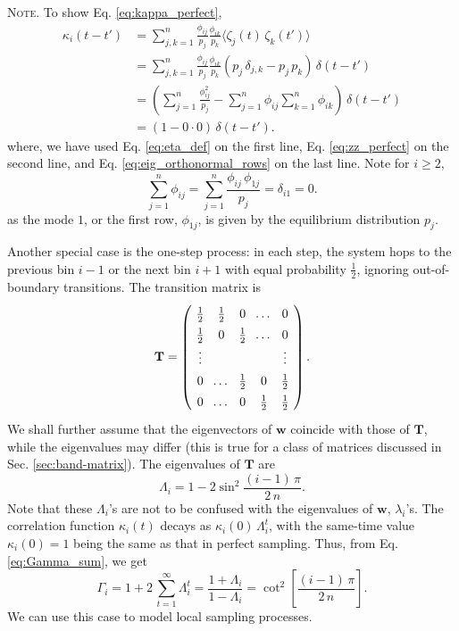 \documentclass[reprint]{revtex4-1}
\newcommand{\note}[1]{{\color{DarkGreen}\footnotesize \textsc{Note.} #1}}
\begin{document}
%
\note{To show Eq. \eqref{eq:kappa_perfect},
  $$
  \begin{aligned}
  \kappa_i(t - t')
  &=
  \sum_{j,k = 1}^n
  \frac{ \phi_{ij} } { p_j }
  \frac{ \phi_{ik} } { p_k }
  \langle \zeta_j(t) \, \zeta_k(t') \rangle
  \\
  &=
  \sum_{j,k = 1}^n
  \frac{ \phi_{ij} } { p_j }
  \frac{ \phi_{ik} } { p_k }
  \left(
    p_j \, \delta_{j, k} - p_j \, p_k
  \right)
  \, \delta(t - t')
  \\
  &=
  \left(
    \sum_{j = 1}^n
    \frac{ \phi_{ij}^2 } { p_j }
    -
    \sum_{j = 1}^n \phi_{ij}
    \sum_{k = 1}^n \phi_{ik}
  \right)
  \, \delta(t - t')
  \\
  &=
  (1 - 0 \cdot 0) \, \delta(t - t').
  \end{aligned}
  $$
  where,
  we have used
  Eq. \eqref{eq:eta_def}
  on the first line,
  Eq. \eqref{eq:zz_perfect}
  on the second line,
  and
  Eq. \eqref{eq:eig_orthonormal_rows}
  on the last line.
  Note for $i \ge 2$,
  $$
  \sum_{j = 1}^n \phi_{ij}
  =
  \sum_{j = 1}^n \frac{ \phi_{ij} \, \phi_{1j} } { p_j }
  =
  \delta_{i1}
  =
  0.
  $$
  as the mode $1$, or the first row, $\phi_{1j}$,
  is given by the equilibrium distribution $p_j$.
}


Another special case is the one-step process\cite{vankampen}:
in each step, the system hops to the previous bin $i - 1$
or the next bin $i + 1$ with equal probability $\frac 1 2$,
ignoring out-of-boundary transitions.
%
The transition matrix is
%
\begin{equation}
\arraycolsep=3.6pt\def\arraystretch{1.4}
\mathbf T
=
\left(
  \begin{array}{cccccccc}
    \frac 1 2 & \frac 1 2 & 0 & \dots & 0 \\
    \frac 1 2 & 0         & \frac 1 2 & \dots & 0 \\
    \vdots & &  & & \vdots \\
    0 & \dots & \frac 1 2 & 0  & \frac 1 2 \\
    0 & \dots & 0 & \frac 1 2 & \frac 1 2
  \end{array}
\right).
\label{eq:T_tridiag}
\end{equation}
%
We shall further assume that
the eigenvectors of $\mathbf w$
coincide with those of $\mathbf T$,
while the eigenvalues may differ
(this is true for a class of matrices
discussed in Sec. \ref{sec:band-matrix}).
%
The eigenvalues of $\mathbf T$ are
$$
\Lambda_i = 1 - 2 \sin^2 \frac{ (i - 1) \, \pi } { 2 \, n }.
$$
Note that these $\Lambda_i$'s are
not to be confused with the eigenvalues of $\mathbf w$,
$\lambda_i$'s.
%
The correlation function $\kappa_i(t)$
decays as $\kappa_i(0) \, \Lambda_i^t$,
with the same-time value $\kappa_i(0) = 1$ being the same as
that in perfect sampling.
%
Thus, from Eq. \eqref{eq:Gamma_sum}, we get
%
\begin{equation}
\Gamma_i
=
1 + 2 \, \sum_{t = 1}^\infty \Lambda_i^t
=
\frac{ 1 + \Lambda_i } { 1 - \Lambda_i }
=
\cot^2 \left[ \frac{ (i - 1) \, \pi } { 2 \, n } \right].
\label{eq:Gamma_onestep}
\end{equation}
%
We can use this case to model local sampling processes.
\end{document}
